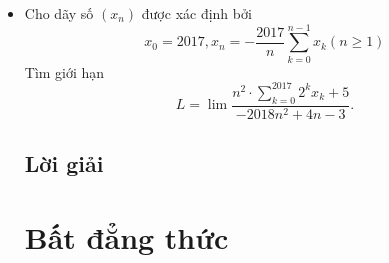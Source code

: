 \documentclass[11pt]{scrartcl}
\begin{document}
\begin{itemize}[label=, leftmargin=0em, itemsep=-0em]

        \item \begin{btvn}
            Cho dãy số $\left(x_n\right)$ được xác định bởi $$x_0=2017, x_n=-\frac{2017}{n} \sum_{k=0}^{n-1} x_k(n \geq 1)$$ Tìm giới hạn
\[
L=\lim \frac{n^2 \cdot\displaystyle \sum_{k=0}^{2017} 2^k x_k+5}{-2018 n^2+4 n-3} .
\]
        \end{btvn}

        \subsection{\LARGE \textcolor{dk}{Lời giải}}
    \newpage
    \thispagestyle{plain}
    
    \section{\huge Bất đẳng thức}

\end{itemize}
\end{document}
